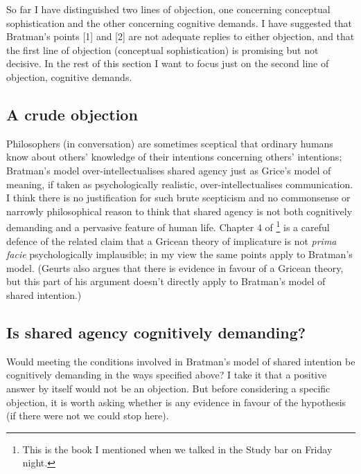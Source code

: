 \documentclass[12pt,letterpaper]{extarticle}
\begin{document}
So far I have distinguished two lines of objection, one concerning conceptual sophistication and the other concerning cognitive demands.
I have suggested that Bratman's points [1] and [2] are not adequate replies to either objection, and that the first line of objection (conceptual sophistication) is promising but not decisive.  
In the rest of this section I want to focus just on the second line of objection, cognitive demands.



\subsection{A crude objection}
Philosophers (in conversation) are sometimes sceptical that ordinary humans know about others' knowledge of their intentions concerning others' intentions; Bratman's model over-intellectualises shared agency just as Grice's model of meaning, if taken as psychologically realistic, over-intellectualises communication.
I think there is no justification for such brute scepticism and no commonsense or narrowly philosophical reason to think that shared agency is not both cognitively demanding and a pervasive feature of human life.
Chapter 4 of \citet{geurts_quantity_2011}\footnote{This is the book I mentioned when we talked in the Study bar on Friday night.}
is a careful defence of the related claim that a Gricean theory of implicature is not \emph{prima facie} psychologically implausible;  in my view the same points apply to Bratman's model.
(Geurts also argues that there is evidence in favour of a Gricean theory, but this part of his argument doesn't directly apply to Bratman's model of shared intention.)


\subsection{Is shared agency cognitively demanding?}
\label{sub_cog_demanding}
Would meeting the conditions involved in Bratman's model of shared intention be cognitively demanding in the ways specified above?
I take it that a positive answer by itself would not be an objection.
But before considering a specific objection, it is worth asking whether is any evidence in favour of the hypothesis (if there were not we could stop here).
\end{document}
